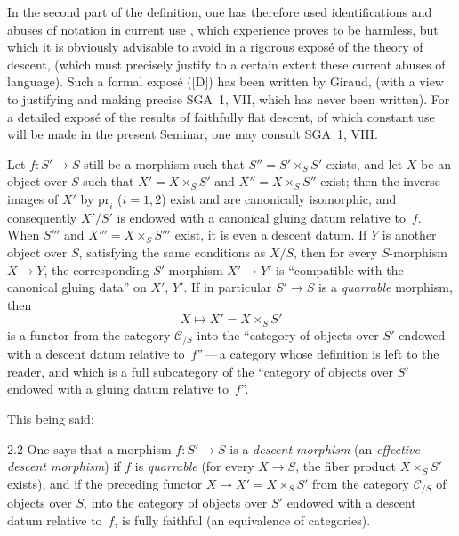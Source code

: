 In the second part of the definition, one has therefore used identifications
and abuses of notation in current
use%
{\renewcommand{\thefootnote}{(8)}},
which experience proves to be harmless, but which it is obviously advisable
to avoid in a rigorous expos\'e of the theory of descent, (which must
precisely justify to a certain extent these current abuses of language).
Such a formal expos\'e ([D]) has been written by Giraud, (with a view to
justifying and making precise SGA~1, VII, which has never been written).
For a detailed expos\'e of the results of faithfully flat descent, of which
constant use will be made in the present Seminar, one may consult
SGA~1, VIII.

Let \(f\colon S'\to S\) still be a morphism such that \(S''=S'\times_{S}S'\)
exists, and let \(X\) be an object over \(S\) such that \(X'=X\times_{S}S'\)
and \(X''=X\times_{S}S''\) exist; then the inverse images of \(X'\) by
\(\mathrm{pr}_{i}\) (\(i=1,2\)) exist and are canonically isomorphic, and
consequently \(X'/S'\) is endowed with a canonical gluing datum relative
to~\(f\). When \(S'''\) and \(X'''=X\times_{S}S'''\) exist, it is even a
descent datum. If \(Y\) is another object over \(S\), satisfying the same
conditions as \(X/S\), then for every \(S\)-morphism \(X\to Y\), the
corresponding \(S'\)-morphism \(X'\to Y'\) is ``compatible with the
canonical gluing data'' on \(X'\), \(Y'\). If in particular \(S'\to S\) is a
\emph{quarrable} morphism, then
\[
X\longmapsto X'=X\times_{S}S'
\]
is a functor from the category \(\mathcal{C}_{/S}\) into the ``category of
objects over \(S'\) endowed with a descent datum relative to~\(f\)''\,---\,a
category whose definition is left to the reader, and which is a full
subcategory of the ``category of objects over \(S'\) endowed with a gluing
datum relative to~\(f\)''.

This being said:

\begin{definition}{2.2}
\label{IV.2.2}
One says that a morphism \(f\colon S'\to S\) is a \emph{descent morphism}
(\resp an \emph{effective descent morphism}) if \(f\) is \emph{quarrable}
(\ie for every \(X\to S\), the fiber product \(X\times_{S}S'\) exists), and
if the preceding functor \(X\mapsto X'=X\times_{S}S'\) from the category
\(\mathcal{C}_{/S}\) of objects over \(S\), into the category of objects
over \(S'\) endowed with a descent datum relative to~\(f\), is fully faithful
(\resp an equivalence of categories).
\end{definition}

